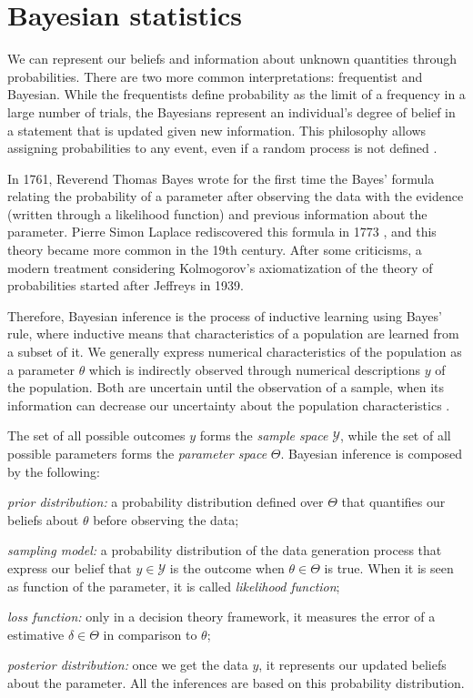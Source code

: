 \section{Bayesian statistics}
\label{sec:bayesian_statistics}

We can represent our beliefs and information about unknown quantities 
through probabilities. There are two more common interpretations: 
frequentist and Bayesian. While the frequentists define
probability as the limit of a frequency in a large number of trials, the
Bayesians represent an individual's degree of belief in a statement that is
updated given new information. This philosophy allows assigning probabilities
to any event, even if a random process is not defined \cite{statisticat2016laplacesdemon}. 

In 1761, Reverend Thomas Bayes wrote for the first time the Bayes' formula
relating the probability of a parameter after observing the data with the
evidence (written through a likelihood function) and previous information
about the parameter. Pierre Simon Laplace rediscovered this formula in 1773
\cite{Robert2007}, and this theory became more common in the 19th century.
After some criticisms, a modern treatment considering Kolmogorov's
axiomatization of the theory of probabilities started after Jeffreys in 1939.

Therefore, Bayesian inference is the process of inductive learning using
Bayes' rule, where inductive means that characteristics of a population are 
learned from a subset of it. We generally
express numerical characteristics of the population as a parameter $\theta$ which is
indirectly observed through numerical descriptions $y$ of the population. Both are
uncertain until the observation of a sample, when its information can decrease
our uncertainty about the population characteristics \cite[p. 1-2]{hoff2009first}.

The set of all possible outcomes $y$ forms the {\em sample space}
$\mathcal{Y}$, while the set of all possible parameters forms the {\em
parameter space} $\Theta$. Bayesian inference is composed by the following: 

\begin{alineas}
    \item {\em prior distribution:} a probability distribution defined over 
    $\Theta$ that quantifies our beliefs about $\theta$ before observing the data;
    \item {\em sampling model: } a probability distribution of the data generation process
    that express our belief that $y \in \mathcal{Y}$ is the outcome when
    $\theta \in \Theta$ is true. When it is seen as function of the parameter,
    it is called {\em likelihood function};
    \item {\em loss function:} only in a decision theory framework, it
    measures the error of a estimative $\delta \in \Theta$ in comparison to
    $\theta$;
    \item {\em posterior distribution:} once we get the data $y$, it
    represents our updated beliefs about the parameter. All the
    inferences are based on this probability distribution.
\end{alineas} 

